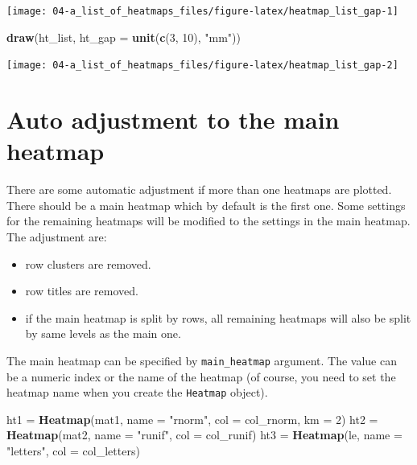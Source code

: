 \documentclass[]{book}
\newenvironment{Shaded}{\begin{snugshade}}{\end{snugshade}}
\newcommand{\KeywordTok}[1]{\textcolor[rgb]{0.13,0.29,0.53}{\textbf{#1}}}
\newcommand{\DataTypeTok}[1]{\textcolor[rgb]{0.13,0.29,0.53}{#1}}
\newcommand{\DecValTok}[1]{\textcolor[rgb]{0.00,0.00,0.81}{#1}}
\newcommand{\StringTok}[1]{\textcolor[rgb]{0.31,0.60,0.02}{#1}}
\newcommand{\NormalTok}[1]{#1}
\providecommand{\tightlist}{%
  \setlength{\itemsep}{0pt}\setlength{\parskip}{0pt}}
\theoremstyle{definition}
\theoremstyle{definition}
\theoremstyle{definition}
\theoremstyle{remark}
\begin{document}
\begin{center}\texttt{[image: 04-a\_list\_of\_heatmaps\_files/figure-latex/heatmap\_list\_gap-1]} \end{center}

\begin{Shaded}
\begin{Highlighting}[]
\KeywordTok{draw}\NormalTok{(ht_list, }\DataTypeTok{ht_gap =} \KeywordTok{unit}\NormalTok{(}\KeywordTok{c}\NormalTok{(}\DecValTok{3}\NormalTok{, }\DecValTok{10}\NormalTok{), }\StringTok{"mm"}\NormalTok{))}
\end{Highlighting}
\end{Shaded}

\begin{center}\texttt{[image: 04-a\_list\_of\_heatmaps\_files/figure-latex/heatmap\_list\_gap-2]} \end{center}

\section{Auto adjustment to the main
heatmap}\label{auto-adjustment-to-the-main-heatmap}

There are some automatic adjustment if more than one heatmaps are
plotted. There should be a main heatmap which by default is the first
one. Some settings for the remaining heatmaps will be modified to the
settings in the main heatmap. The adjustment are:

\begin{itemize}
\tightlist
\item
  row clusters are removed.
\item
  row titles are removed.
\item
  if the main heatmap is split by rows, all remaining heatmaps will also
  be split by same levels as the main one.
\end{itemize}

The main heatmap can be specified by \texttt{main\_heatmap} argument.
The value can be a numeric index or the name of the heatmap (of course,
you need to set the heatmap name when you create the \texttt{Heatmap}
object).

\begin{Shaded}
\begin{Highlighting}[]
\NormalTok{ht1 =}\StringTok{ }\KeywordTok{Heatmap}\NormalTok{(mat1, }\DataTypeTok{name =} \StringTok{"rnorm"}\NormalTok{, }\DataTypeTok{col =}\NormalTok{ col_rnorm, }\DataTypeTok{km =} \DecValTok{2}\NormalTok{)}
\NormalTok{ht2 =}\StringTok{ }\KeywordTok{Heatmap}\NormalTok{(mat2, }\DataTypeTok{name =} \StringTok{"runif"}\NormalTok{, }\DataTypeTok{col =}\NormalTok{ col_runif)}
\NormalTok{ht3 =}\StringTok{ }\KeywordTok{Heatmap}\NormalTok{(le, }\DataTypeTok{name =} \StringTok{"letters"}\NormalTok{, }\DataTypeTok{col =}\NormalTok{ col_letters)}
\end{Highlighting}
\end{Shaded}
\end{document}
